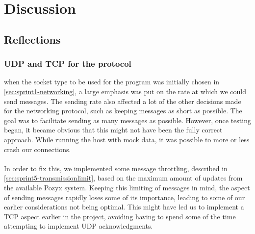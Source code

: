 \section{Discussion}

\subsection{Reflections}

\subsubsection{UDP and TCP for the protocol}
when the socket type to be used for the program was initially chosen in \autoref{sec:sprint1-networking}, a large emphasis was put on the rate at which we could send messages.
The sending rate also affected a lot of the other decisions made for the networking protocol, such as keeping messages as short as possible.
The goal was to facilitate sending as many messages as possible.
However, once testing began, it became obvious that this might not have been the fully correct approach.
While running the host with mock data, it was possible to more or less crash our connections.
\\\\
In order to fix this, we implemented some message throttling, described in \autoref{sec:sprint5-transmissionlimit}, based on the maximum amount of updates from the available Pozyx system.
Keeping this limiting of messages in mind, the aspect of sending messages rapidly loses some of its importance, leading to some of our earlier considerations not being optimal.
This might have led us to implement a TCP aspect earlier in the project, avoiding having to spend some of the time attempting to implement UDP acknowledgments. 

